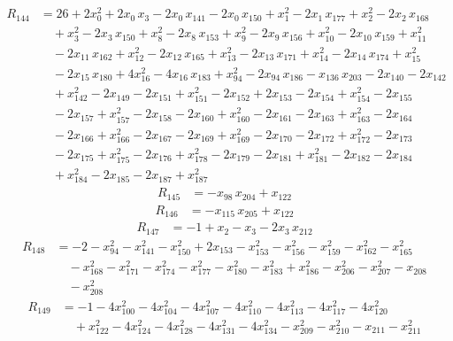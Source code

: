 \begin{align*}
R_{144} &= 26 +2x_{0}^{2} +2x_{0}\,x_{3} -2x_{0}\,x_{141} -2x_{0}\,x_{150} +x_{1}^{2} -2x_{1}\,x_{177} +x_{2}^{2} -2x_{2}\,x_{168} \\
&\quad {} +x_{3}^{2} -2x_{3}\,x_{150} +x_{8}^{2} -2x_{8}\,x_{153} +x_{9}^{2} -2x_{9}\,x_{156} +x_{10}^{2} -2x_{10}\,x_{159} +x_{11}^{2} \\
&\quad {} -2x_{11}\,x_{162} +x_{12}^{2} -2x_{12}\,x_{165} +x_{13}^{2} -2x_{13}\,x_{171} +x_{14}^{2} -2x_{14}\,x_{174} +x_{15}^{2} \\
&\quad {} -2x_{15}\,x_{180} +4x_{16}^{2} -4x_{16}\,x_{183} +x_{94}^{2} -2x_{94}\,x_{186} -x_{136}\,x_{203} -2x_{140} -2x_{142} \\
&\quad {} +x_{142}^{2} -2x_{149} -2x_{151} +x_{151}^{2} -2x_{152} +2x_{153} -2x_{154} +x_{154}^{2} -2x_{155} \\
&\quad {} -2x_{157} +x_{157}^{2} -2x_{158} -2x_{160} +x_{160}^{2} -2x_{161} -2x_{163} +x_{163}^{2} -2x_{164} \\
&\quad {} -2x_{166} +x_{166}^{2} -2x_{167} -2x_{169} +x_{169}^{2} -2x_{170} -2x_{172} +x_{172}^{2} -2x_{173} \\
&\quad {} -2x_{175} +x_{175}^{2} -2x_{176} +x_{178}^{2} -2x_{179} -2x_{181} +x_{181}^{2} -2x_{182} -2x_{184} \\
&\quad {} +x_{184}^{2} -2x_{185} -2x_{187} +x_{187}^{2}
\end{align*}
\begin{align*}
R_{145} &= -x_{98}\,x_{204} +x_{122}
\end{align*}
\begin{align*}
R_{146} &= -x_{115}\,x_{205} +x_{122}
\end{align*}
\begin{align*}
R_{147} &= -1 +x_{2} -x_{3} -2x_{3}\,x_{212}
\end{align*}
\begin{align*}
R_{148} &= -2 -x_{94}^{2} -x_{141}^{2} -x_{150}^{2} +2x_{153} -x_{153}^{2} -x_{156}^{2} -x_{159}^{2} -x_{162}^{2} -x_{165}^{2} \\
&\quad {} -x_{168}^{2} -x_{171}^{2} -x_{174}^{2} -x_{177}^{2} -x_{180}^{2} -x_{183}^{2} +x_{186}^{2} -x_{206}^{2} -x_{207}^{2} -x_{208} \\
&\quad {} -x_{208}^{2}
\end{align*}
\begin{align*}
R_{149} &= -1 -4x_{100}^{2} -4x_{104}^{2} -4x_{107}^{2} -4x_{110}^{2} -4x_{113}^{2} -4x_{117}^{2} -4x_{120}^{2} \\
&\quad {} +x_{122}^{2} -4x_{124}^{2} -4x_{128}^{2} -4x_{131}^{2} -4x_{134}^{2} -x_{209}^{2} -x_{210}^{2} -x_{211} -x_{211}^{2}
\end{align*}
